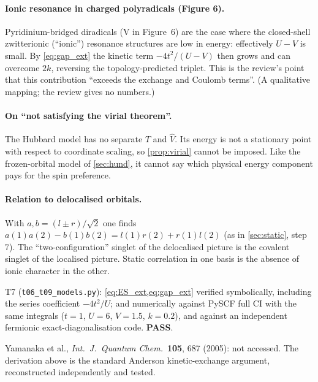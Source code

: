 \paragraph{Ionic resonance in charged polyradicals (Figure 6).} Pyridinium-bridged diradicals (V in
Figure~6) are the case where the closed-shell zwitterionic (``ionic'') resonance structures are low in
energy: effectively $U-V$ is small. By \cref{eq:gap_ext} the kinetic term $-4t^2/(U-V)$ then grows and
can overcome $2k$, reversing the topology-predicted triplet. This is the review's point that this
contribution ``exceeds the exchange and Coulomb terms''. (A qualitative mapping; the review gives no
numbers.)

\paragraph{On ``not satisfying the virial theorem''.} The Hubbard model has no separate $\hat T$ and $\hat V$.
Its energy is not a stationary point with respect to coordinate scaling, so \cref{prop:virial} cannot be
imposed. Like the frozen-orbital model of \cref{sec:hund}, it cannot say which physical energy component
pays for the spin preference.

\paragraph{Relation to delocalised orbitals.} With $a,b=(l\pm r)/\sqrt2$ one finds
$a(1)a(2)-b(1)b(2)=l(1)r(2)+r(1)l(2)$ (as in \cref{sec:static}, step 7). The ``two-configuration'' singlet of
the delocalised picture is the covalent singlet of the localised picture. Static correlation in one
basis is the absence of ionic character in the other.

\begin{verifybox}
T7 (\texttt{t06\_t09\_models.py}): \cref{eq:ES_ext,eq:gap_ext} verified symbolically, including the series
coefficient $-4t^2/U$; and numerically against PySCF full CI with the same integrals ($t=1$, $U=6$,
$V=1.5$, $k=0.2$), and against an independent fermionic exact-diagonalisation code. \textbf{PASS}.
\end{verifybox}
\begin{sourcebox}
Yamanaka et al., \emph{Int.\ J.\ Quantum Chem.}\ \textbf{105}, 687 (2005): not accessed. The derivation above
is the standard Anderson kinetic-exchange argument, reconstructed independently and tested.
\end{sourcebox}
